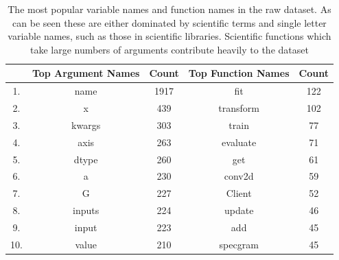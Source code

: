 \begin{table}[h!]
    \begin{center}
    \begin{tabular}{c | c | c | c | c}
    & Top Argument Names & Count  &   Top Function Names & Count \\  
    \hline               
    1.   &  name     &     1917    &   fit       &    122 \\        
    2.   &  x        &     439     &   transform &    102 \\         
    3.   &  kwargs   &     303     &   train     &    77 \\         
    4.   &  axis     &     263     &   evaluate  &    71 \\        
    5.   &  dtype    &     260     &   get       &    61 \\         
    6.   &  a        &     230     &   conv2d    &    59 \\        
    7.   &  G        &     227     &   Client    &    52 \\        
    8.   &  inputs   &     224     &   update    &    46 \\        
    9.   &  input    &     223     &   add       &    45 \\         
    10.  &  value    &     210     &   specgram  &    45 \\         
    
    \end{tabular}
    \caption {The most popular variable names and function names in the raw dataset. As can be seen these are either dominated by scientific terms and single letter variable names, such as those in scientific libraries. Scientific functions which take large numbers of arguments contribute heavily to the dataset}
    \label{table:popular_variable_names}
    \end{center}
\end{table}

